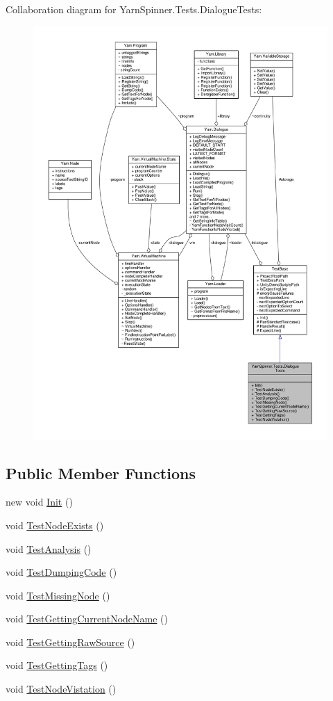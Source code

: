Collaboration diagram for Yarn\-Spinner.\-Tests.\-Dialogue\-Tests\-:
\nopagebreak
\begin{figure}[H]
\begin{center}
\leavevmode
\includegraphics[width=350pt]{a00726}
\end{center}
\end{figure}
\subsection*{Public Member Functions}
\begin{DoxyCompactItemize}
\item 
new void \hyperlink{a00092_a49813a64c710540348c15365a672e675}{Init} ()
\item 
void \hyperlink{a00092_a9d4171827bf3eba4c6ae52760a475f45}{Test\-Node\-Exists} ()
\item 
void \hyperlink{a00092_a40b0efb3cac1715b44640c29988139f1}{Test\-Analysis} ()
\item 
void \hyperlink{a00092_a111f0f8418baaeaf83cfb422c90210e0}{Test\-Dumping\-Code} ()
\item 
void \hyperlink{a00092_a013d5e3847b9d716b39aa925d70b99fd}{Test\-Missing\-Node} ()
\item 
void \hyperlink{a00092_afbb342ea64e33ee19d42a6a2c949592a}{Test\-Getting\-Current\-Node\-Name} ()
\item 
void \hyperlink{a00092_a16ed34de323da529e1a17670f556791c}{Test\-Getting\-Raw\-Source} ()
\item 
void \hyperlink{a00092_abb7bc5876ca4f37e93c6ac40bbd0e3b7}{Test\-Getting\-Tags} ()
\item 
void \hyperlink{a00092_a9c0d2732044b273929dbce35358a1906}{Test\-Node\-Vistation} ()
\end{DoxyCompactItemize}
